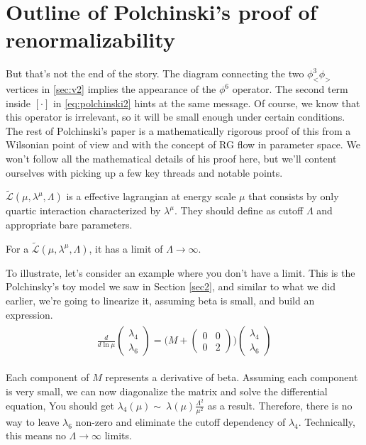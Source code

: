 \documentclass[12pt,halfline,a4paper]{ouparticle}
\begin{document}
\section{Outline of Polchinski's proof of renormalizability}
But that's not the end of the story. The diagram connecting the two $\phi_<^3\phi_>$ vertices in \ref{sec:v2} implies the appearance of the $\phi^6$ operator. The second term inside $[\cdot]$ in \ref{eq:polchinski2} hints at the same message.
Of course, we know that this operator is irrelevant, so it will be small enough under certain conditions. The rest of Polchinski's paper is a mathematically rigorous proof of this from a Wilsonian point of view and with the concept of RG flow in parameter space.
We won't follow all the mathematical details of his proof here, but we'll content ourselves with picking up a few key threads and notable points.
\begin{definition}
	$\tilde{\mathcal L}(\mu,\lambda^\mu,\Lambda)$ is a effective lagrangian at energy scale $\mu$ that consists by only quartic interaction characterized by $\lambda^\mu$. They should define as cutoff $\Lambda$ and appropriate bare parameters.
\end{definition}
\begin{theorem}
	\label{thm:renormalizability}
	For a $\tilde{\mathcal L}(\mu,\lambda^\mu,\Lambda)$, it has a limit of $\Lambda\rightarrow\infty$.
\end{theorem}
To illustrate, let's consider an example where you don't have a limit. This is the Polchinsky's toy model we saw in Section \ref{sec2}, and similar to what we did earlier, we're going to linearize it, assuming beta is small, and build an expression.
\begin{align}
	\begin{split}
		\frac{d}{d\ln \mu}\begin{pmatrix}
			\lambda_4\\\lambda_6
		\end{pmatrix}=\bigg(M+\begin{pmatrix}
			0&0\\0&2
		\end{pmatrix}\bigg)	\begin{pmatrix}
			\lambda_4\\\lambda_6
		\end{pmatrix}
	\end{split}
\end{align}

Each component of $M$ represents a derivative of beta. Assuming each component is very small, we can now diagonalize the matrix and solve the differential equation, You should get $\lambda_4(\mu)\sim~\lambda(\mu)\frac{\Lambda^2}{\mu^2}$ as a result.
Therefore, there is no way to leave $\lambda_6$ non-zero and eliminate the cutoff dependency of $\lambda_4$. Technically, this means no $\Lambda\rightarrow\infty$ limits.
\end{document}
